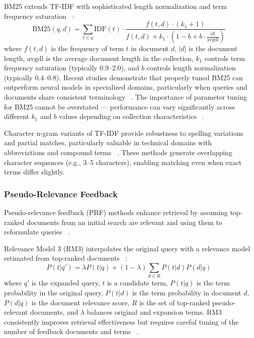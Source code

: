 \documentclass[preprint,12pt]{elsarticle}
\begin{document}
BM25 extends TF-IDF with sophisticated length normalization and term frequency saturation ~\cite{robertson2009probabilistic}:
\begin{equation}
\text{BM25}(q,d) = \sum_{t \in q} \text{IDF}(t) \cdot \frac{f(t,d) \cdot (k_1 + 1)}{f(t,d) + k_1 \cdot (1 - b + b \cdot \frac{|d|}{\text{avgdl}})}
\end{equation}
where $f(t,d)$ is the frequency of term $t$ in document $d$, $|d|$ is the document length, $\text{avgdl}$ is the average document length in the collection, $k_1$ controls term frequency saturation (typically 0.9--2.0), and $b$ controls length normalization (typically 0.4--0.8). Recent studies demonstrate that properly tuned BM25 can outperform neural models in specialized domains, particularly when queries and documents share consistent terminology ~\cite{thakur2021beir}. The importance of parameter tuning for BM25 cannot be overstated --- performance can vary significantly across different $k_1$ and $b$ values depending on collection characteristics ~\cite{trotmanImprovementsBM25Language2014}.

Character n-gram variants of TF-IDF provide robustness to spelling variations and partial matches, particularly valuable in technical domains with abbreviations and compound terms ~\cite{mcnameeCharacterNGramTokenization2004}. These methods generate overlapping character sequences (e.g., 3--5 characters), enabling matching even when exact terms differ slightly.

\subsubsection{Pseudo-Relevance Feedback}

Pseudo-relevance feedback (PRF) methods enhance retrieval by assuming top-ranked documents from an initial search are relevant and using them to reformulate queries ~\cite{rocchio1971relevance}.

Relevance Model 3 (RM3) interpolates the original query with a relevance model estimated from top-ranked documents ~\cite{abdul2004umass}:
\begin{equation}
P(t|q') = \lambda P(t|q) + (1-\lambda) \sum_{d \in R} P(t|d) P(d|q)
\end{equation}
where $q'$ is the expanded query, $t$ is a candidate term, $P(t|q)$ is the term probability in the original query, $P(t|d)$ is the term probability in document $d$, $P(d|q)$ is the document relevance score, $R$ is the set of top-ranked pseudo-relevant documents, and $\lambda$ balances original and expansion terms. RM3 consistently improves retrieval effectiveness but requires careful tuning of the number of feedback documents and terms ~\cite{lv2010empirical}.
\end{document}
